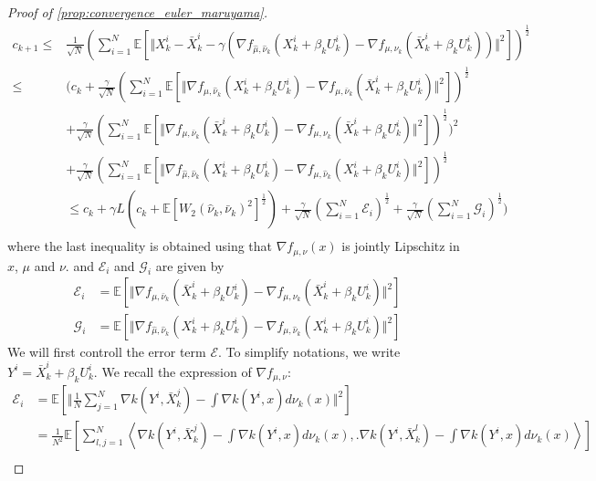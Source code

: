 \begin{proof}[Proof of \cref{prop:convergence_euler_maruyama}]
\begin{align*}
c_{k+1}\leq & \frac{1}{\sqrt{N}}\left(\sum_{i=1}^{N}\mathbb{E}\left[\Vert X_{k}^{i}-\bar{X}_{k}^{i}-\gamma(\nabla f_{\hat{\mu},\hat{\nu}_{k}}(X_{k}^{i}+\beta_{k}U_{k}^{i})-\nabla f_{\mu,\nu_{k}}(\bar{X}_{k}^{i}+\beta_{k}U_{k}^{i}))\Vert^{2}\right]\right)^{\frac{1}{2}}\label{eq:main_inequality_c_k_1}\\
\leq & (c_{k}+\frac{\gamma}{\sqrt{N}}(\sum_{i=1}^{N}\mathbb{E}[\Vert\nabla f_{\mu,\hat{\nu}_{k}}(X_{k}^{i}+\beta_{k}U_{k}^{i})-\nabla f_{\mu,\bar{\nu}_{k}}(\bar{X}_{k}^{i}+\beta_{k}U_{k}^{i})\Vert^{2}])^{\frac{1}{2}}\\
&+\frac{\gamma}{\sqrt{N}}(\sum_{i=1}^{N}\mathbb{E}[\Vert\nabla f_{\mu,\bar{\nu}_{k}}(\bar{X}_{k}^{i}+\beta_{k}U_{k}^{i})-\nabla f_{\mu,\nu_{k}}(\bar{X}_{k}^{i}+\beta_{k}U_{k}^{i})\Vert^{2}])^{\frac{1}{2}})^{2}\nonumber \\
 & +\frac{\gamma}{\sqrt{N}}(\sum_{i=1}^{N}\mathbb{E}[\Vert\nabla f_{\hat{\mu},\hat{\nu}_{k}}(X_{k}^{i}+\beta_{k}U_{k}^{i})-\nabla f_{\mu,\hat{\nu}_{k}}(X_{k}^{i}+\beta_{k}U_{k}^{i})\Vert^{2}])^{\frac{1}{2}}\\
 & \leq c_{k}+\gamma L(c_{k}+\mathbb{E}[W_{2}(\hat{\nu}_{k},\bar{\nu}_{k})^{2}]^{\frac{1}{2}})+\frac{\gamma}{\sqrt{N}}(\sum_{i=1}^{N}\mathcal{E}_{i})^{\frac{1}{2}}+\frac{\gamma}{\sqrt{N}}(\sum_{i=1}^{N}\mathcal{G}_{i})^{\frac{1}{2}})\nonumber \\
\end{align*}
where the last inequality is obtained using that $\nabla f_{\mu,\nu}(x)$
is jointly Lipschitz in $x$, $\mu$ and $\nu$. and $\mathcal{E}_{i}$
and $\mathcal{G}_{i}$ are given by 
\begin{align*}
\mathcal{E}_{i} & =\mathbb{E}[\Vert\nabla f_{\mu,\bar{\nu}_{k}}(\bar{X}_{k}^{i}+\beta_{k}U_{k}^{i})-\nabla f_{\mu,\nu_{k}}(\bar{X}_{k}^{i}+\beta_{k}U_{k}^{i})\Vert^{2}]\\
\mathcal{G}_{i} & =\mathbb{E}[\Vert\nabla f_{\hat{\mu},\hat{\nu}_{k}}(X_{k}^{i}+\beta_{k}U_{k}^{i})-\nabla f_{\mu,\hat{\nu}_{k}}(X_{k}^{i}+\beta_{k}U_{k}^{i})\Vert^{2}]
\end{align*}
We will first controll the error term $\mathcal{E}$. To simplify
notations, we write $Y^{i}=\bar{X}_{k}^{i}+\beta_{k}U_{k}^{i}$.  We
recall the expression of $\nabla f_{\mu,\nu}:$
\begin{align*}
\mathcal{E}_{i} & =\mathbb{E}[\Vert\frac{1}{N}\sum_{j=1}^{N}\nabla k(Y^{i},\bar{X}_{k}^{j})-\int\nabla k(Y^{i},x)d\nu_{k}(x)\Vert^{2}]\\
 & =\frac{1}{N^{2}}\mathbb{E}[\sum_{l,j=1}^{N}\left\langle\nabla k(Y^{i},\bar{X}_{k}^{j})-\int\nabla k(Y^{i},x)d\nu_{k}(x),.\nabla k(Y^{i},\bar{X}_{k}^{l})-\int\nabla k(Y^{i},x)d\nu_{k}(x)\right\rangle]\\

\end{align*}
\end{proof}
